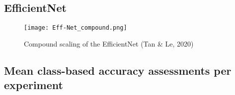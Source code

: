 \documentclass[11pt, a4paper, twoside]{report}
\begin{document}
\subsection{EfficientNet}\label{Eff-Net}

\begin{figure}[H]
  \centering
  \texttt{[image: Eff-Net\_compound.png]}
  \caption{Compound scaling of the EfficientNet (Tan \& Le, 2020)}
  \label{app:EfficientNet}
\end{figure}

\newpage

\begin{landscape}
\subsection{Mean class-based accuracy assessments per experiment}


\end{landscape}
\end{document}
